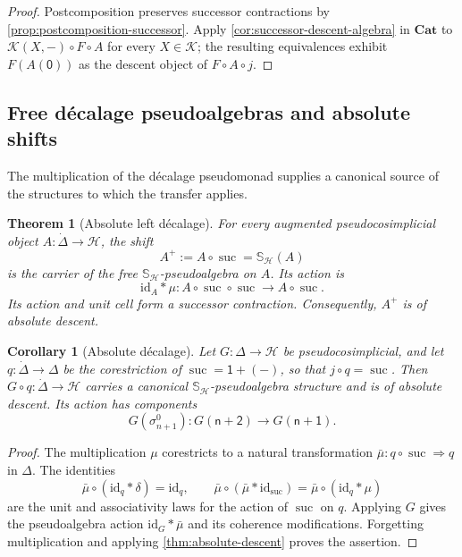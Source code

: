 \documentclass[11pt,a4paper]{article}
\numberwithin{equation}{section}
\newtheorem{theorem}{Theorem}[section]
\newtheorem{corollary}[corollary]{Corollary}
\theoremstyle{definition}
\theoremstyle{remark}
\newcommand{\id}{\mathrm{id}}
\newcommand{\Hcat}{\mathcal H}
\newcommand{\Kcat}{\mathcal K}
\newcommand{\Cat}{\mathbf{Cat}}
\newcommand{\suc}{\operatorname{suc}}
\newcommand{\Smon}{\mathbb S}
\begin{document}
\begin{proof}
Postcomposition preserves successor contractions by
\cref{prop:postcomposition-successor}. Apply
\cref{cor:successor-descent-algebra} in $\Cat$ to
$\Kcat(X,-)\circ F\circ A$ for every $X\in\Kcat$; the resulting
equivalences exhibit $F(A(\mathsf0))$ as the descent object of
$F\circ A\circ j$.
\end{proof}

\subsection{Free d\'ecalage pseudoalgebras and absolute shifts}

The multiplication of the d\'ecalage pseudomonad supplies a canonical
source of the structures to which the transfer applies.

\begin{theorem}[Absolute left d\'ecalage]
\label{thm:absolute-shifts}
For every augmented pseudocosimplicial object
$A\colon\dot\Delta\to\Hcat$, the shift
\[
  A^+:=A\circ\suc=\Smon_{\Hcat}(A)
\]
is the carrier of the free $\Smon_{\Hcat}$-pseudoalgebra on $A$.
Its action is
\begin{equation}
  \id_A\ast\mu\colon A\circ\suc\circ\suc\longrightarrow A\circ\suc.
  \label{eq:free-successor-action}
\end{equation}
Its action and unit cell form a successor contraction.
Consequently, $A^+$ is of absolute descent.
\end{theorem}

\begin{corollary}[Absolute d\'ecalage]
\label{cor:absolute-decalage}
Let $G\colon\Delta\to\Hcat$ be pseudocosimplicial, and let
$q\colon\dot\Delta\to\Delta$ be the corestriction of
$\suc=\mathsf1+(-)$, so that $j\circ q=\suc$. Then
$G\circ q\colon\dot\Delta\to\Hcat$ carries a canonical
$\Smon_{\Hcat}$-pseudoalgebra structure and is of absolute descent.
Its action has components
\[
  G(\sigma_{n+1}^0)\colon G(\mathsf{n+2})\longrightarrow G(\mathsf{n+1}).
\]
\end{corollary}

\begin{proof}
The multiplication $\mu$ corestricts to a natural transformation
$\bar\mu\colon q\circ\suc\Rightarrow q$ in $\Delta$. The identities
\[
  \bar\mu\circ(\id_q\ast\delta)=\id_q,
  \qquad
  \bar\mu\circ(\bar\mu\ast\id_{\suc})
   =\bar\mu\circ(\id_q\ast\mu)
\]
are the unit and associativity laws for the action of $\suc$ on
$q$. Applying $G$ gives the pseudoalgebra action $\id_G\ast\bar\mu$ and
its coherence modifications. Forgetting multiplication and applying
\cref{thm:absolute-descent} proves the assertion.
\end{proof}
\end{document}
